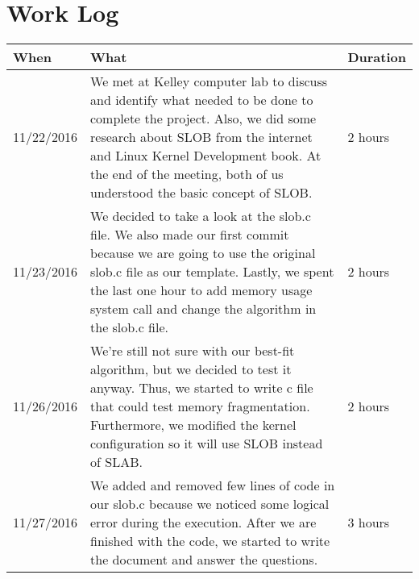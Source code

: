 \documentclass[letterpaper,10pt,draftclsnofoot,titlepage,onecolumn]{IEEEtran}
\begin{document}
\clearpage

\section{Work Log}
\begin{center}
\begin{tabular}{ |m{2cm}|m{10cm}|m{2cm}| }
\hline
When & What & Duration \\ \hline
11/22/2016
& We met at Kelley computer lab to discuss and identify what needed to be done to complete the project. 
Also, we did some research about SLOB from the internet and Linux Kernel Development book.
At the end of the meeting, both of us understood the basic concept of SLOB.
& 2 hours\\ 
\hline

11/23/2016 
& We decided to take a look at the slob.c file. 
We also made our first commit because we are going to use the original slob.c file as our template.
Lastly, we spent the last one hour to add memory usage system call and change the algorithm in the slob.c file.
& 2 hours\\ 
\hline

11/26/2016 
& We're still not sure with our best-fit algorithm, but we decided to test it anyway. 
Thus, we started to write c file that could test memory fragmentation. 
Furthermore, we modified the kernel configuration so it will use SLOB instead of SLAB.
& 2 hours\\ 
\hline

11/27/2016 
& We added and removed few lines of code in our slob.c because we noticed some logical error
during the execution.
After we are finished with the code, we started to write the document and answer the questions.
& 3 hours\\ 
\hline

\end{tabular}
\end{center}
\end{document}
